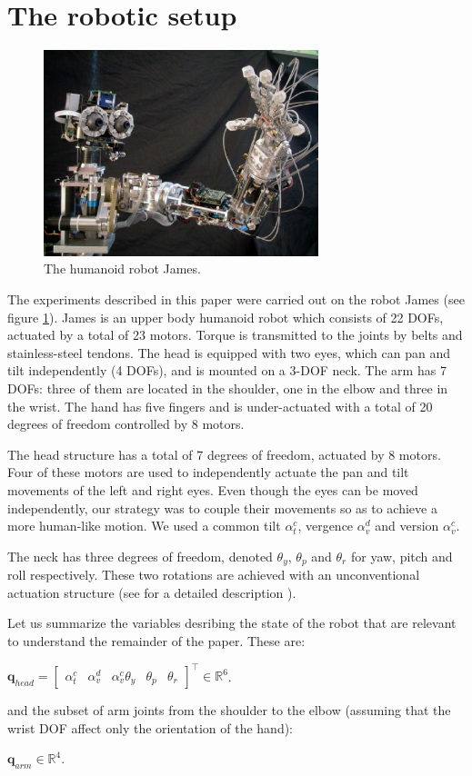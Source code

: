 \section{The robotic setup}

\begin{figure}[tbph]
\centering
\includegraphics[width=80mm]{Figure/James1.eps}
\caption{The humanoid robot James.}
\label{Fig:PicureJames}
\end{figure}

The experiments described in this paper were carried out on the robot 
James (see figure \ref{Fig:PicureJames}). James is an upper body 
humanoid robot which consists of 22 DOFs, actuated by a total of 
23 motors. Torque is transmitted to the joints by belts and 
stainless-steel tendons. The head is equipped with two eyes, which 
can pan and tilt independently (4 DOFs), and is mounted on a 3-DOF 
neck. The arm has 7 DOFs: three of them are located in the shoulder, 
one in the elbow and three in the wrist. The hand has five fingers 
and is under-actuated with a total of 20 degrees of freedom controlled 
by 8 motors. 

The head structure has a total of 7 degrees of freedom, actuated by 8 
motors. Four of these motors are used to independently actuate the pan 
and tilt movements of the left and right eyes. Even though the eyes 
can be moved independently, our strategy was to couple their movements 
so as to achieve a more human-like motion. We used a common tilt 
$\alpha_t^c$, vergence $\alpha_v^d$ and version $\alpha_v^c$. 

The neck has three degrees of freedom, denoted $\theta_y$, 
$\theta_p$ and $\theta_r$ for yaw, pitch and roll respectively. These 
two rotations are achieved with an unconventional actuation structure 
(see for a detailed description \cite{jamone06james}). 

Let us summarize the variables desribing the state of the robot that 
are relevant to understand the remainder of the paper. These are:

$\mathbf q_{head} = \begin{bmatrix} \alpha_t^c & \alpha_v^d & \alpha_v^c
\theta_y & \theta_p & \theta_r \end{bmatrix}^\top \in \mathbb R^6$.

and the subset of arm joints from the shoulder to the elbow (assuming
that the wrist DOF affect only the orientation of the hand):

$\mathbf q_{arm} \in \mathbb R^4$.


